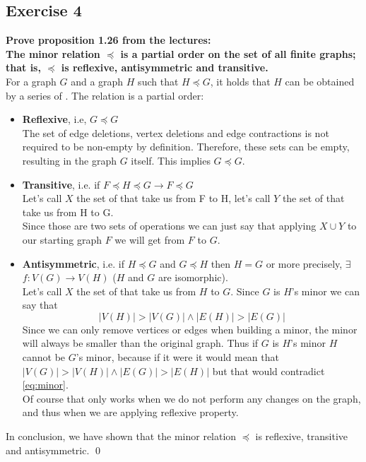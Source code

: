 \subsection*{Exercise 4}
\textbf{Prove proposition 1.26 from the lectures: \\
\linebreak 
The minor relation $\preccurlyeq$ is a partial order on the set of all finite graphs; that is, $\preccurlyeq$ is reflexive, antisymmetric and transitive.} \\
\linebreak
For a graph $G$ and a graph $H$ such that $H \preccurlyeq G$, it holds that $H$ can be obtained by a series of \lazy. The relation is a partial order: 
\begin{itemize}
    \item \textbf{Reflexive}, i.e, $G \preccurlyeq G$ \\
    \linebreak 
    The set of edge deletions, vertex deletions and edge contractions is not required to be non-empty by definition. Therefore, these sets can be empty, resulting in the graph $G$ itself. This implies $G \preccurlyeq G$. 
    \item \textbf{Transitive}, i.e. if $F \preccurlyeq H \preccurlyeq G \rightarrow F \preccurlyeq G$ \\
    \linebreak 
    Let's call $X$ the set of \lazyspc that take us from F to H, let's call $Y$ the set of \lazyspc that take us from H to G. \\
    \linebreak 
    Since those are two sets of operations we can just say that applying $X \cup Y$ to our starting graph $F$ we will get from $F$ to $G$.
    
    \item \textbf{Antisymmetric}, i.e. if $H \preccurlyeq G$ and $G \preccurlyeq H$ then $H = G$ or more precisely, $\exists$ $f : V(G)\to V(H)$ ($H$ and $G$ are isomorphic). \\
    \linebreak
    Let's call $X$ the set of \lazyspc that take us from $H$ to $G$. Since $G$ is $H$'s minor we can say that 
    \begin{equation}
        |V(H)| > |V(G)| \land |E(H)| > |E(G)|\label{eq:minor}
    \end{equation}
    Since we can only remove vertices or edges when building a minor, the minor will always be smaller than the original graph. Thus if $G$ is $H$'s minor $H$ cannot be $G$'s minor, because if it were it would mean that $|V(G)| > |V(H)| \land |E(G)| > |E(H)|$ but that would contradict \eqref{eq:minor}.\\
    \linebreak 
    Of course that only works when we do not perform any changes on the graph, and thus when we are applying reflexive property.
\end{itemize}
In conclusion, we have shown that the minor relation $\preccurlyeq$ is reflexive, transitive and antisymmetric. \qed